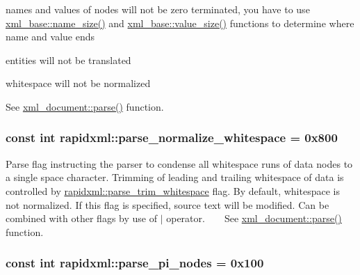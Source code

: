 \begin{DoxyItemize}
\item names and values of nodes will not be zero terminated, you have to use \hyperlink{classrapidxml_1_1xml__base_a7e7f98b3d01e1eab8dc1ca69aad9af84}{xml\+\_\+base\+::name\+\_\+size()} and \hyperlink{classrapidxml_1_1xml__base_a9fcf201ed0915ac18dd43b0b5dcfaf32}{xml\+\_\+base\+::value\+\_\+size()} functions to determine where name and value ends 
\item entities will not be translated 
\item whitespace will not be normalized 
\end{DoxyItemize}See \hyperlink{singletonrapidxml_1_1xml__document_ac6e73ff9ac323bf5a370c38feb03a6b1}{xml\+\_\+document\+::parse()} function. \hypertarget{namespacerapidxml_a31f33885defb5176a7d99e524c35d386}{
\subsubsection[{parse\+\_\+normalize\+\_\+whitespace}]{\setlength{\rightskip}{0pt plus 5cm}const int rapidxml\+::parse\+\_\+normalize\+\_\+whitespace = 0x800}}\label{namespacerapidxml_a31f33885defb5176a7d99e524c35d386}
Parse flag instructing the parser to condense all whitespace runs of data nodes to a single space character. Trimming of leading and trailing whitespace of data is controlled by \hyperlink{namespacerapidxml_a61912424b47db5038e726d4e1c22417f}{rapidxml\+::parse\+\_\+trim\+\_\+whitespace} flag. By default, whitespace is not normalized. If this flag is specified, source text will be modified. Can be combined with other flags by use of $\vert$ operator. ~\newline
~\newline
 See \hyperlink{singletonrapidxml_1_1xml__document_ac6e73ff9ac323bf5a370c38feb03a6b1}{xml\+\_\+document\+::parse()} function. \hypertarget{namespacerapidxml_a03fe68fcf5d28f38476e0fd31adecc4c}{
\subsubsection[{parse\+\_\+pi\+\_\+nodes}]{\setlength{\rightskip}{0pt plus 5cm}const int rapidxml\+::parse\+\_\+pi\+\_\+nodes = 0x100}}\label{namespacerapidxml_a03fe68fcf5d28f38476e0fd31adecc4c}
